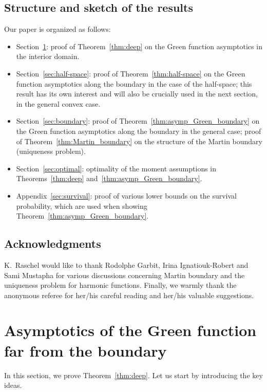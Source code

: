 \documentclass[AHL,Unicode,longabstracts,published]{cedram}
\begin{document}
\subsection*{Structure and sketch of the results} Our paper is organized as follows:
\begin{itemize}
\item Section~\ref{sec:interior}: proof of Theorem~\ref{thm:deep} on the Green function asymptotics in the interior domain.
\item Section~\ref{sec:half-space}: proof of Theorem~\ref{thm:half-space} on the Green function asymptotics along the boundary in the case of the half-space; this result has its own interest and will also be crucially used in the next section, in the general convex case.
\item Section~\ref{sec:boundary}: proof of Theorem~\ref{thm:asymp_Green_boundary} on the Green function asymptotics along the boundary in the general case; proof of Theorem~\ref{thm:Martin_boundary} on the structure of the Martin boundary (uniqueness problem).
\item Section~\ref{sec:optimal}: optimality of the moment assumptions in Theorems~\ref{thm:deep} and~\ref{thm:asymp_Green_boundary}.
\item Appendix~\ref{sec:survival}: proof of various lower bounds on the survival probability, which are used when showing Theorem~\ref{thm:asymp_Green_boundary}.
\end{itemize}


\subsection*{Acknowledgments}
K.~Raschel would like to thank Rodolphe Garbit, Irina Ignatiouk-Robert and Sami Mustapha for various discussions concerning Martin boundary and the uniqueness problem for harmonic functions. Finally, we warmly thank the anonymous referee for her/his careful reading and her/his valuable suggestions.



\section{Asymptotics of the Green function far from the boundary}\label{sec:interior}

In this section, we prove Theorem~\ref{thm:deep}. Let us start by introducing the key ideas.
\end{document}
